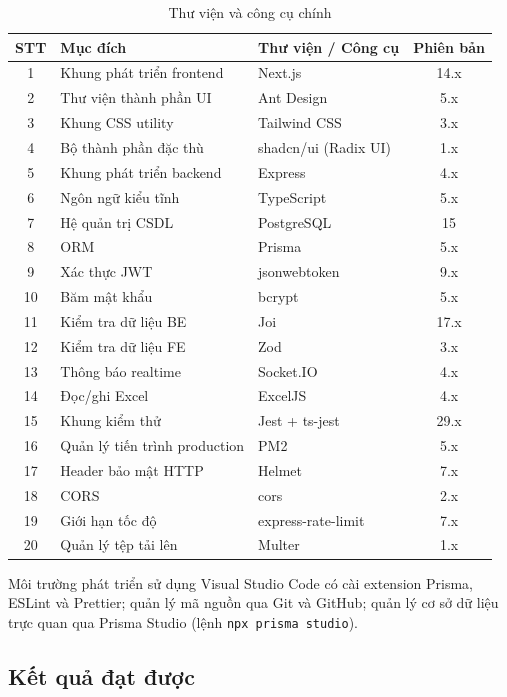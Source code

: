 \documentclass[../DoAn.tex]{subfiles}
\begin{document}
\begin{table}[H]
\centering
\caption{Thư viện và công cụ chính}
\label{tab:thuvien}
\begin{tabular}{|c|p{6cm}|p{4.5cm}|c|}
\hline
\textbf{STT} & \textbf{Mục đích} & \textbf{Thư viện / Công cụ} & \textbf{Phiên bản} \\ \hline
1 & Khung phát triển frontend & Next.js & 14.x \\ \hline
2 & Thư viện thành phần UI & Ant Design & 5.x \\ \hline
3 & Khung CSS utility & Tailwind CSS & 3.x \\ \hline
4 & Bộ thành phần đặc thù & shadcn/ui (Radix UI) & 1.x \\ \hline
5 & Khung phát triển backend & Express & 4.x \\ \hline
6 & Ngôn ngữ kiểu tĩnh & TypeScript & 5.x \\ \hline
7 & Hệ quản trị CSDL & PostgreSQL & 15 \\ \hline
8 & ORM & Prisma & 5.x \\ \hline
9 & Xác thực JWT & jsonwebtoken & 9.x \\ \hline
10 & Băm mật khẩu & bcrypt & 5.x \\ \hline
11 & Kiểm tra dữ liệu BE & Joi & 17.x \\ \hline
12 & Kiểm tra dữ liệu FE & Zod & 3.x \\ \hline
13 & Thông báo realtime & Socket.IO & 4.x \\ \hline
14 & Đọc/ghi Excel & ExcelJS & 4.x \\ \hline
15 & Khung kiểm thử & Jest + ts-jest & 29.x \\ \hline
16 & Quản lý tiến trình production & PM2 & 5.x \\ \hline
17 & Header bảo mật HTTP & Helmet & 7.x \\ \hline
18 & CORS & cors & 2.x \\ \hline
19 & Giới hạn tốc độ & express-rate-limit & 7.x \\ \hline
20 & Quản lý tệp tải lên & Multer & 1.x \\ \hline
\end{tabular}
\end{table}

Môi trường phát triển sử dụng Visual Studio Code có cài extension Prisma, ESLint và Prettier; quản lý mã nguồn qua Git và GitHub; quản lý cơ sở dữ liệu trực quan qua Prisma Studio (lệnh \texttt{npx prisma studio}).

\subsection{Kết quả đạt được}
\label{subsection:4.3.2}
\end{document}

